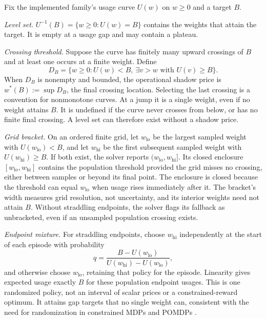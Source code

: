 \documentclass[runningheads]{llncs}
\begin{document}
\begin{definition}
\label{def:pi3}
Fix the implemented family's usage curve $U(w)$ on $w\ge0$ and a target $B$.

\emph{Level set.} $U^{-1}(B)=\{w\ge0:U(w)=B\}$ contains the weights that attain the target. It is empty at a usage gap and may contain a plateau.

\emph{Crossing threshold.} Suppose the curve has finitely many upward crossings of $B$ and at least one occurs at a finite weight. Define
\[
D_B=\{w\ge0:U(w)<B,\ \exists v>w\text{ with }U(v)\ge B\}.
\]
When $D_B$ is nonempty and bounded, the operational shadow price is $w^*(B):=\sup D_B$, the final crossing location. Selecting the last crossing is a convention for nonmonotone curves. At a jump it is a single weight, even if no weight attains $B$. It is undefined if the curve never crosses from below, or has no finite final crossing. A level set can therefore exist without a shadow price.

\emph{Grid bracket.} On an ordered finite grid, let $w_{\mathrm{lo}}$ be the largest sampled weight with $U(w_{\mathrm{lo}})<B$, and let $w_{\mathrm{hi}}$ be the first subsequent sampled weight with $U(w_{\mathrm{hi}})\ge B$. If both exist, the solver reports $(w_{\mathrm{lo}},w_{\mathrm{hi}}]$. Its closed enclosure $[w_{\mathrm{lo}},w_{\mathrm{hi}}]$ contains the population threshold provided the grid misses no crossing, either between samples or beyond its final point. The enclosure is closed because the threshold can equal $w_{\mathrm{lo}}$ when usage rises immediately after it. The bracket's width measures grid resolution, not uncertainty, and its interior weights need not attain $B$. Without straddling endpoints, the solver flags its fallback as unbracketed, even if an unsampled population crossing exists.

\emph{Endpoint mixture.} For straddling endpoints, choose $w_{\mathrm{hi}}$ independently at the start of each episode with probability
\[
q=\frac{B-U(w_{\mathrm{lo}})}{U(w_{\mathrm{hi}})-U(w_{\mathrm{lo}})},
\]
and otherwise choose $w_{\mathrm{lo}}$, retaining that policy for the episode. Linearity gives expected usage exactly $B$ for these population endpoint usages. This is one randomized policy, not an interval of scalar prices or a constrained-reward optimum. It attains gap targets that no single weight can, consistent with the need for randomization in constrained MDPs and POMDPs \citep{altman1999,kim2011cpomdp}.
\end{definition}
\end{document}
